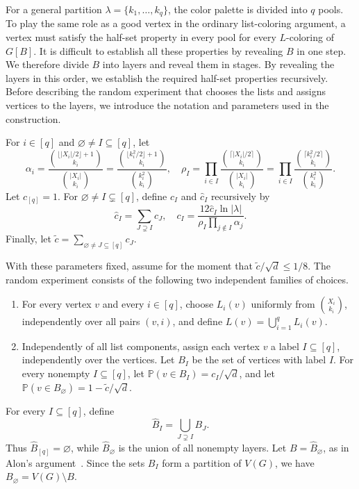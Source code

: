 \documentclass[12pt]{article}
\numberwithin{equation}{section}
\theoremstyle{definition}
\newcommand{\Prob}{\mathbb{P}}
\begin{document}
For a general partition $\lambda=\{k_1,\ldots,k_q\}$, the color palette is
divided into $q$ pools. To play the same role as a good vertex in the
ordinary list-coloring argument, a vertex must satisfy the half-set property
in every pool for every $L$-coloring of $G[B]$. It is difficult to establish
all these properties by revealing $B$ in one step. We therefore divide $B$
into layers and reveal them in stages. By revealing the layers in this order,
we establish the required half-set properties recursively. Before describing the random experiment that chooses the lists and assigns
vertices to the layers, we introduce the notation and parameters used in the
construction.



For $i \in [q]$ and $\varnothing \ne I \subseteq [q]$, let
\[
 \alpha_i =
 \frac{\binom{\lfloor |X_i|/2\rfloor + 1}{k_i}}
 {\binom{|X_i|}{k_i}}=\frac{\binom{\lfloor k_i^2/2\rfloor + 1}{k_i}}
 {\binom{k_i^2}{k_i}},
 \quad
 \rho_I =
 \prod_{i \in I}
 \frac{\binom{\lceil |X_i|/2\rceil}{k_i}}
 {\binom{|X_i|}{k_i}}=\prod_{i \in I}
 \frac{\binom{\lceil k_i^2 /2\rceil}{k_i}}
 {\binom{k_i^2}{k_i}}.
\]
Let $c_{[q]}=1$. For $\varnothing\ne I\subsetneq[q]$, define $c_I$ and
$\hat{c}_I$ recursively by
\begin{equation}\label{eq:c-recursion}
 \hat{c}_{I} = \sum_{J \supsetneq I}c_J,
 \quad
 c_I = \frac{12\hat{c}_{I}\ln |\lambda|}
 {\rho_I\prod_{j \notin I}\alpha_j}.
\end{equation}
Finally, let
$\widetilde{c} = \sum_{\varnothing \ne J \subseteq [q]}c_J$.

With these parameters fixed, assume for the moment that
$\widetilde{c}/\sqrt{d} \leq 1/8$.
The random experiment consists of the following two independent families of
choices.
\begin{enumerate}
\item For every vertex $v$ and every $i \in [q]$, choose $L_i(v)$ uniformly
from $\binom{X_i}{k_i}$, independently over all pairs $(v,i)$, and define
$L(v)=\bigcup_{i=1}^q L_i(v)$.
\item Independently of all list components, assign each vertex $v$ a label
$I\subseteq[q]$, independently over the vertices. Let $B_I$ be the set of
vertices with label $I$. For every nonempty $I\subseteq[q]$, let
$\Prob(v\in B_I)=c_I/\sqrt d$, and let
$\Prob(v\in B_\varnothing)=1-\widetilde c/\sqrt d$.
\end{enumerate}
For every $I \subseteq [q]$, define
\[
 \hat{B}_{I} = \bigcup_{J \supsetneq I}B_J.
\]
Thus $\hat{B}_{[q]}=\varnothing$, while $\hat{B}_{\varnothing}$ is the union
of all nonempty layers. Let $B=\hat{B}_{\varnothing}$, as in Alon's
argument~\cite{Alon2000}. Since the sets $B_I$ form a partition of $V(G)$,
we have $B_\varnothing=V(G)\setminus B$.
\end{document}
